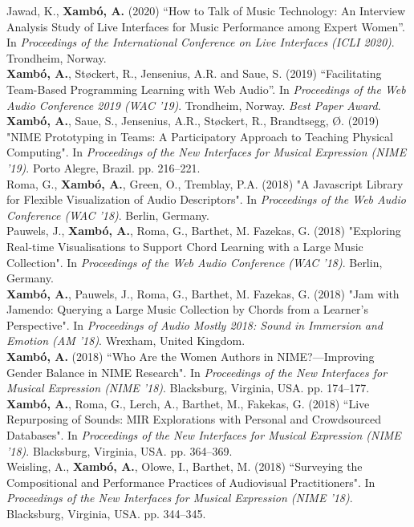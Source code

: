 \documentclass[10pt, a4paper]{article}
\newcommand{\years}[1]{\marginnote{\scriptsize #1}}
\begin{document}
\years{2020}Jawad, K., \textbf{Xambó, A.} (2020) ``How to Talk of Music Technology: An Interview Analysis Study of Live Interfaces for Music Performance among Expert Women''. In \emph{Proceedings of the International Conference on Live Interfaces (ICLI 2020)}. Trondheim, Norway.\\
\years{2019b}\textbf{Xambó, A.}, Støckert, R., Jensenius, A.R. and Saue, S. (2019) ``Facilitating Team-Based Programming Learning with Web Audio''. In \emph{Proceedings of the Web Audio Conference 2019 (WAC '19)}. Trondheim, Norway. \emph{Best Paper Award}.\\
\years{2019a}\textbf{Xambó, A.}, Saue, S., Jensenius, A.R., Støckert, R., Brandtsegg, Ø. (2019) "NIME Prototyping in Teams: A Participatory Approach to Teaching Physical Computing". In \emph{Proceedings of the New Interfaces for Musical Expression (NIME ’19)}. Porto Alegre, Brazil. pp. 216–221.\\
\years{2018f}Roma, G., \textbf{Xambó, A.}, Green, O., Tremblay, P.A. (2018) "A Javascript Library for Flexible Visualization of Audio Descriptors". In \emph{Proceedings of the Web Audio Conference (WAC '18)}. Berlin, Germany.\\
\years{2018e}Pauwels, J., \textbf{Xambó, A.}, Roma, G., Barthet, M. Fazekas, G. (2018) "Exploring Real-time Visualisations to Support Chord Learning with a Large Music Collection". In \emph{Proceedings of the Web Audio Conference (WAC '18)}. Berlin, Germany.\\
\years{2018d}\textbf{Xambó, A.}, Pauwels, J., Roma, G., Barthet, M. Fazekas, G. (2018) "Jam with Jamendo: Querying a Large Music Collection by Chords from a Learner’s Perspective". In \emph{Proceedings of Audio Mostly 2018: Sound in Immersion and Emotion (AM '18)}. Wrexham, United Kingdom. \\
\years{2018c}\textbf{Xambó, A.} (2018) “Who Are the Women Authors in NIME?---Improving Gender Balance in NIME Research". In \emph{Proceedings of the New Interfaces for Musical Expression (NIME '18)}. Blacksburg, Virginia, USA. pp. 174--177.\\ 
\years{2018b}\textbf{Xambó, A.}, Roma, G., Lerch, A., Barthet, M., Fakekas, G. (2018) “Live Repurposing of Sounds: MIR Explorations with Personal and Crowdsourced Databases". In \emph{Proceedings of the New Interfaces for Musical Expression (NIME '18)}. Blacksburg, Virginia, USA. pp. 364--369.\\ 
\years{2018a}Weisling, A., \textbf{Xambó, A.}, Olowe, I., Barthet, M. (2018) “Surveying the Compositional and Performance Practices of Audiovisual Practitioners". In \emph{Proceedings of the New Interfaces for Musical Expression (NIME '18)}. Blacksburg, Virginia, USA. pp. 344--345.\\ 
\end{document}
